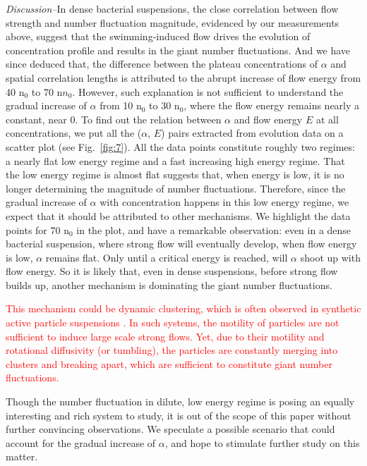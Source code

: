 \documentclass[twocolumn,aps,prl,amsmath,amssymb,longbibliography]{revtex4-1}
\begin{document}
\textit{Discussion--}In dense bacterial suspensions, the close correlation between flow strength and number fluctuation magnitude, evidenced by our measurements above, suggest that the swimming-induced flow drives the evolution of concentration profile and results in the giant number fluctuations. And we have since deduced that, the difference between the plateau concentrations of $\alpha$ and spatial correlation lengths is attributed to the abrupt increase of flow energy from 40 n$_0$ to 70 n$n_0$. However, such explanation is not sufficient to understand the gradual increase of $\alpha$ from 10 n$_0$ to 30 n$_0$, where the flow energy remains nearly a constant, near 0. To find out the relation between $\alpha$ and flow energy $E$ at all concentrations, we put all the ($\alpha$, $E$) pairs extracted from evolution data on a scatter plot (see Fig.~\ref{fig:7}). All the data points constitute roughly two regimes: a nearly flat low energy regime and a fast increasing high energy regime. That the low energy regime is almost flat suggests that, when energy is low, it is no longer determining the magnitude of number fluctuations. Therefore, since the gradual increase of $\alpha$ with concentration happens in this low energy regime, we expect that it should be attributed to other mechanisms. We highlight the data points for 70 n$_0$ in the plot, and have a remarkable observation: even in a dense bacterial suspension, where strong flow will eventually develop, when flow energy is low, $\alpha$ remains flat. Only until a critical energy is reached, will $\alpha$ shoot up with flow energy. So it is likely that, even in dense suspensions, before strong flow builds up, another mechanism is dominating the giant number fluctuations.

\textcolor{red}{This mechanism could be dynamic clustering, which is often observed in synthetic active particle suspensions
 \cite{PhysRevLett.108.268303, Palacci2013, PhysRevLett.123.208002}. In such systems, the motility of particles are not sufficient to induce large scale strong flows. Yet, due to their motility and rotational diffusivity (or tumbling), the particles are constantly merging into clusters and breaking apart, which are sufficient to constitute giant number fluctuations.}

Though the number fluctuation in dilute, low energy regime is posing an equally interesting and rich system to study, it is out of the scope of this paper without further convincing observations. We speculate a possible scenario that could account for the gradual increase of $\alpha$, and hope to stimulate further study on this matter.
\end{document}
